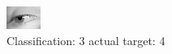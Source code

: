 \begin{figure}[h!]
\begin{center}
\includegraphics[width=0.60\columnwidth]{figures/ID3003_class_3_target_4.png}
\end{center}
\caption{ Classification: 3 actual target: 4}
\label{fig:ID3003_class_3_target_4}
\end{figure}
